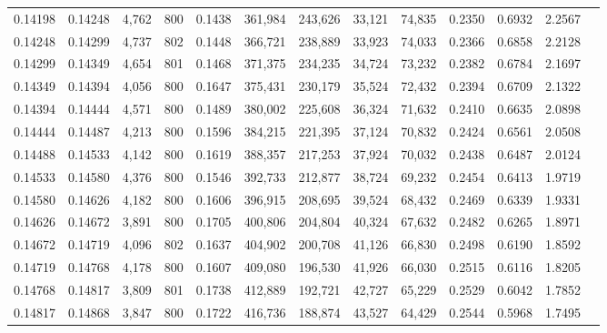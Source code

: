 \begin{tabular}{rrrrrrrrrrrrr}
0.14198 & 0.14248 &  4,762 &   800 &                                     0.1438 & 361,984 & 243,626 &  33,121 &  74,835 & 0.2350 & 0.6932 & 2.2567 \\
0.14248 & 0.14299 &  4,737 &   802 &                                     0.1448 & 366,721 & 238,889 &  33,923 &  74,033 & 0.2366 & 0.6858 & 2.2128 \\
0.14299 & 0.14349 &  4,654 &   801 &                                     0.1468 & 371,375 & 234,235 &  34,724 &  73,232 & 0.2382 & 0.6784 & 2.1697 \\
0.14349 & 0.14394 &  4,056 &   800 &                                     0.1647 & 375,431 & 230,179 &  35,524 &  72,432 & 0.2394 & 0.6709 & 2.1322 \\
0.14394 & 0.14444 &  4,571 &   800 &                                     0.1489 & 380,002 & 225,608 &  36,324 &  71,632 & 0.2410 & 0.6635 & 2.0898 \\
0.14444 & 0.14487 &  4,213 &   800 &                                     0.1596 & 384,215 & 221,395 &  37,124 &  70,832 & 0.2424 & 0.6561 & 2.0508 \\
0.14488 & 0.14533 &  4,142 &   800 &                                     0.1619 & 388,357 & 217,253 &  37,924 &  70,032 & 0.2438 & 0.6487 & 2.0124 \\
0.14533 & 0.14580 &  4,376 &   800 &                                     0.1546 & 392,733 & 212,877 &  38,724 &  69,232 & 0.2454 & 0.6413 & 1.9719 \\
0.14580 & 0.14626 &  4,182 &   800 &                                     0.1606 & 396,915 & 208,695 &  39,524 &  68,432 & 0.2469 & 0.6339 & 1.9331 \\
0.14626 & 0.14672 &  3,891 &   800 &                                     0.1705 & 400,806 & 204,804 &  40,324 &  67,632 & 0.2482 & 0.6265 & 1.8971 \\
0.14672 & 0.14719 &  4,096 &   802 &                                     0.1637 & 404,902 & 200,708 &  41,126 &  66,830 & 0.2498 & 0.6190 & 1.8592 \\
0.14719 & 0.14768 &  4,178 &   800 &                                     0.1607 & 409,080 & 196,530 &  41,926 &  66,030 & 0.2515 & 0.6116 & 1.8205 \\
0.14768 & 0.14817 &  3,809 &   801 &                                     0.1738 & 412,889 & 192,721 &  42,727 &  65,229 & 0.2529 & 0.6042 & 1.7852 \\
0.14817 & 0.14868 &  3,847 &   800 &                                     0.1722 & 416,736 & 188,874 &  43,527 &  64,429 & 0.2544 & 0.5968 & 1.7495 \\

\end{tabular}
